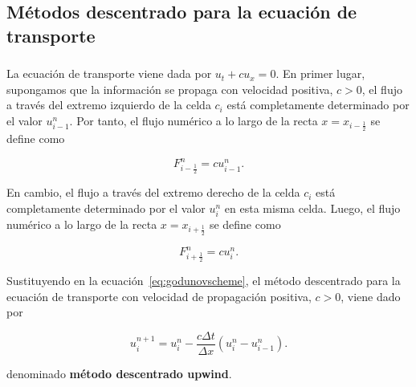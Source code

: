 \subsection{Métodos descentrado para la ecuación de transporte}

\begin{frame}
    \frametitle{\subsecname}

    La ecuación de transporte viene dada por $u_{t}+cu_{x}=0$.
    En primer lugar, supongamos que la información se propaga con
    velocidad positiva, $c>0$, el flujo a través del extremo
    izquierdo de la celda $c_{i}$ está completamente determinado por el
    valor $u^{n}_{i-1}$.
    Por tanto, el flujo numérico a lo largo de la recta
    $x=x_{i-\frac{1}{2}}$ se define como

    \begin{equation*}
        F^{n}_{i-\frac{1}{2}}=
        cu^{n}_{i-1}.
    \end{equation*}

    En cambio, el flujo a través del extremo derecho de la celda $c_{i}$
    está completamente determinado por el valor $u^{n}_{i}$ en esta misma celda.
    Luego, el flujo numérico a lo largo de la recta $x=x_{i+\frac{1}{2}}$
    se define como

    \begin{equation*}
        F^{n}_{i+\frac{1}{2}}=
        cu^{n}_{i}.
    \end{equation*}

    Sustituyendo en la ecuación~\eqref{eq:godunovscheme}, el método
    descentrado para la ecuación de transporte con velocidad de
    propagación positiva, $c>0$, viene dado por

    \begin{equation}\label{eq:upwind}
        u^{n+1}_{i}=
        u^{n}_{i}-
        \frac{c\Delta t}{\Delta x}
        \left(
        u^{n}_{i}-
        u^{n}_{i-1}
        \right).
    \end{equation}

    denominado \textbf{método descentrado upwind}.
\end{frame}


